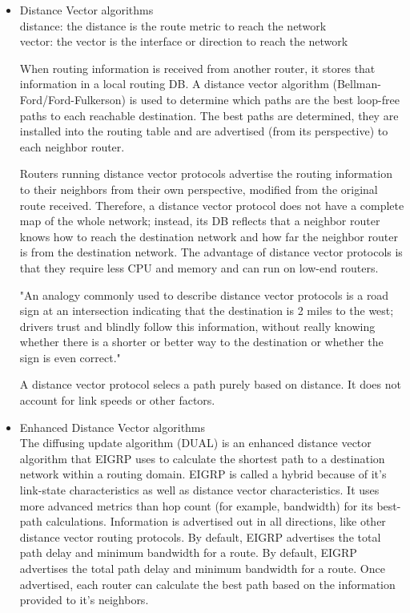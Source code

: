 \documentclass{article}
\begin{document}
\begin{itemize}
\item Distance Vector algorithms\\

	distance: the distance is the route metric to reach the network\\
	vector: the vector is the interface or direction to reach the  network

	When routing information is received from another router, it stores that information in a local routing DB. A distance vector algorithm  (Bellman-Ford/Ford-Fulkerson) is used to determine which paths are the best loop-free paths to each reachable destination. The best paths are determined, they are installed into the routing table and are advertised (from its perspective) to each neighbor router.

	Routers running distance vector protocols advertise the routing information to their neighbors from their own perspective, modified from the original route received. Therefore, a distance vector protocol does not have a complete map of the whole network; instead, its DB reflects that a neighbor router knows how to reach the destination network and how far the neighbor router is from the destination network. The advantage of distance vector protocols is that they require less CPU and memory and can run on low-end routers.

"An analogy commonly used to describe distance vector protocols is a road sign at an intersection indicating that the destination is 2 miles to the west; drivers trust and blindly follow this information, without really knowing whether there is a shorter or better way to the destination or whether the sign is even correct."

	A distance vector protocol selecs a path purely based on distance. It does not account for link speeds or other factors.

\item Enhanced Distance Vector algorithms\\

	The diffusing update algorithm (DUAL) is an enhanced distance vector algorithm that EIGRP uses to calculate the shortest path to a destination network within a routing domain. EIGRP is called a hybrid because of it's link-state characteristics as well as distance vector characteristics. It uses more advanced metrics than hop count (for example, bandwidth) for its best-path calculations. Information is advertised out in all directions, like other distance vector routing protocols. By default, EIGRP advertises the total path delay and minimum bandwidth for a route. By default, EIGRP advertises the total path delay and minimum bandwidth for a route. Once advertised, each router can calculate the best path based on the information provided to it's neighbors.


\end{itemize}
\end{document}

